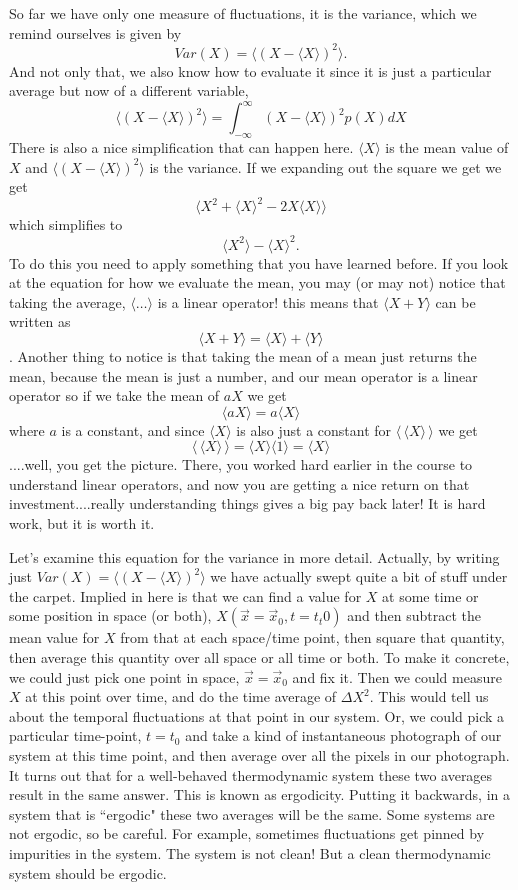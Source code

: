 \documentclass[]{revtex4}
\newcommand{\sm}[1]{{\[#1\]}}
\begin{document}
So far we have only one measure of fluctuations, it is the variance, which we remind ourselves is given by
\sm{Var(X) = \langle (X - \langle X\rangle)^2\rangle.}
And not only that, we also know how to evaluate it since it is just a particular average but now of a different variable,
\sm{\langle (X - \langle X\rangle)^2\rangle={\int_{-\infty}^{\infty} (X-\langle X \rangle)^2 p(X)dX}}
There is also a nice simplification that can happen here.
$\langle X \rangle$  is the mean value of $X$ and $\langle (X -\langle X\rangle)^2\rangle$ is the variance.
If we expanding out the square we get we get
\sm{\langle X^2 + \langle X\rangle^2-2X\langle X\rangle\rangle}
which simplifies to
\sm{\langle X^2\rangle-\langle X\rangle^2.}
To do this you need to apply something that you have learned before.  If you look at the equation for
how we evaluate the mean, you may (or may not) notice that taking the average, $\langle \ldots\rangle$ is
a linear operator!  this means that $\langle  X+Y \rangle$ can be written as
\sm{\langle  X+Y \rangle = \langle  X \rangle+\langle  Y \rangle}.
Another thing to notice is that taking the mean of a mean just returns the mean, because the mean is just a
number, and our mean operator is a linear operator so if we take the mean of $aX$ we get
\sm{\langle  aX \rangle = a\langle  X \rangle}
where $a$ is a constant, and since $\langle  X \rangle$ is also just a constant for $\langle\,\langle  X \rangle\, \rangle$
we get
\sm{\langle\,\langle  X \rangle\, \rangle = \langle  X \rangle\langle 1\rangle = \langle  X \rangle}
....well, you get the picture.
There, you worked hard earlier in the course to understand linear operators, and now you are getting a nice
return on that investment....really understanding things gives a big pay back later!  It is hard work, but
it is worth it.



Let's examine this equation for the variance in more detail.  Actually, by writing just $Var(X) = \langle (X - \langle X\rangle)^2\rangle$
we have actually swept quite a bit of stuff under the carpet.
Implied in here is that we can find a value for $X$ at some time or some position in space (or both), $X(\vec{x}=\vec{x}_0,t=t_t0)$
and then subtract the mean value for $X$ from that at each space/time point, then square that quantity, then average this quantity over all space
or all time or both.  To make it concrete, we could just pick one point in space, $\vec{x}=\vec{x}_0$ and fix it.  Then we could measure $X$ at this
point over time, and do the time average of $\Delta X^2$.  This would tell us about the temporal fluctuations at that point in our system.
Or, we could pick a particular
time-point, $t=t_0$ and take a kind of instantaneous photograph of our system at this time point, and then average over all the pixels in our
photograph.  It turns out that for a well-behaved thermodynamic system these two averages result in the same answer.  This is known as ergodicity.
Putting it backwards, in a system that is ``ergodic" these two averages will be the same.  Some systems are not ergodic, so be careful.  For
example, sometimes fluctuations get pinned by impurities in the system.  The system is not clean!  But a clean thermodynamic system should be
ergodic.
\end{document}
